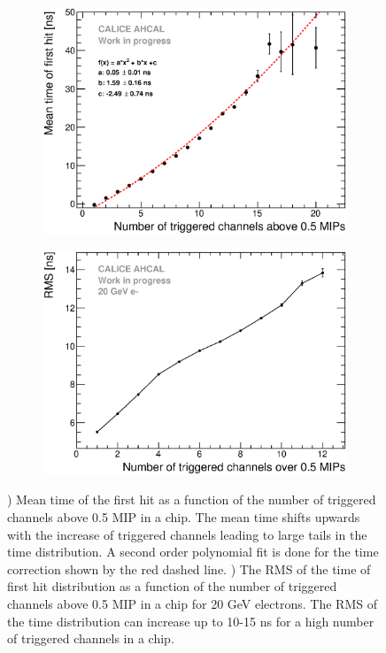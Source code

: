 \begin{figure}[htbp!]
	\begin{subfigure}[t]{0.49\textwidth}
		\centering
		\includegraphics[width=1\textwidth]{../Thesis_Plots/Timing/Electrons/Plots/NumberHits_Dependance_AllEnergies.eps}
		\caption{}\label{fig:nhits_profile}
	\end{subfigure}
	\hfill
	\begin{subfigure}[t]{0.49\textwidth}
		\centering
		\includegraphics[width=1\textwidth]{../Thesis_Plots/Timing/Electrons/Plots/ParametrisationPedestalShift_20GeV.eps}
		\caption{}\label{fig:RMS_nHits}
	\end{subfigure}
	\caption{) Mean time of the first hit as a function of the number of triggered channels above 0.5 MIP in a chip. The mean time shifts upwards with the increase of triggered channels leading to large tails in the time distribution. A second order polynomial fit is done for the time correction shown by the red dashed line. ) The RMS of the time of first hit distribution as a function of the number of triggered channels above 0.5 MIP in a chip for 20 GeV electrons. The RMS of the time distribution can increase up to 10-15 ns for a high number of triggered channels in a chip.}
\end{figure}

